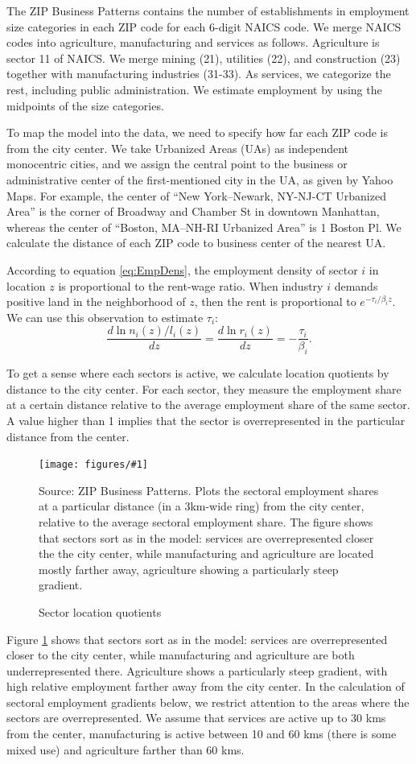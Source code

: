 \documentclass[12pt]{article}
\newcommand{\dofigure}[3]{\begin{figure}
\begin{centering}
\texttt{[image: figures/\#1]}
  \caption{#2\label{fig:#1}}
\end{centering}

\noindent \footnotesize{#3}
\end{figure}}
\begin{document}
The ZIP Business Patterns contains the number of establishments in employment size categories in each ZIP code for each 6-digit NAICS code. We merge NAICS codes into agriculture, manufacturing and services as follows. Agriculture is sector 11 of NAICS. We merge mining (21), utilities (22), and construction (23) together with manufacturing industries (31-33). As services, we categorize the rest, including public administration. We estimate employment by using the midpoints of the size categories.

To map the model into the data, we need to specify how far each ZIP code is from the city center. We take Urbanized Areas (UAs) as independent monocentric cities, and we assign the central point to the business or administrative center of the first-mentioned city in the UA, as given by Yahoo Maps. For example, the center of ``New York–Newark, NY-NJ-CT Urbanized Area'' is the corner of Broadway and Chamber St in downtown Manhattan, whereas the center of ``Boston, MA–NH-RI Urbanized Area'' is 1 Boston Pl. We calculate the distance of each ZIP code to business center of the nearest UA.

According to equation \ref{eq:EmpDens}, the employment density of sector $i$ in location $z$ is proportional to the rent-wage ratio. When industry $i$ demands positive land in the neighborhood of $z$, then the rent is proportional to $e^{-\tau_i/\beta_i z}$. We can use this observation to estimate $\tau_i$:
\[
\frac{d\ln n_i(z)/l_i(z)}{dz} =\frac{d\ln r_i(z)}{dz} = -\frac{\tau_i}{\beta_i}.
\]

To get a sense where each sectors is active, we calculate location quotients by distance to the city center. For each sector, they measure the employment share at a certain distance relative to the average employment share of the same sector. A value higher than 1 implies that the sector is overrepresented in the particular distance from the center.

\dofigure{sector_location_quotients}{Sector location quotients}{Source: ZIP Business Patterns. Plots the sectoral employment shares at a particular distance (in a 3km-wide ring) from the city center, relative to the average sectoral employment share. The figure shows that sectors sort as in the model: services are overrepresented closer the the city center, while manufacturing and agriculture are located mostly farther away, agriculture showing a particularly steep gradient.}

Figure \ref{fig:sector_location_quotients} shows that sectors sort as in the model: services are overrepresented closer to the city center, while manufacturing and agriculture are both underrepresented there. Agriculture shows a particularly steep gradient, with high relative employment farther away from the city center. In the calculation of sectoral employment gradients below, we restrict attention to the areas where the sectors are overrepresented. We assume that services are active up to 30 kms from the center, manufacturing is active between 10 and 60 kms (there is some mixed use) and agriculture farther than 60 kms.
\end{document}
